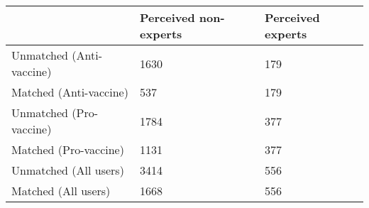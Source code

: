 \begin{table}[ht]
\centering
\begin{tabular}{lll}
  \hline
  & Perceived non-experts & Perceived experts \\ 
  \hline
Unmatched (Anti-vaccine) & 1630 & 179 \\ 
  Matched (Anti-vaccine) & 537 & 179 \\ 
  Unmatched (Pro-vaccine) & 1784 & 377 \\ 
  Matched (Pro-vaccine) & 1131 & 377 \\ 
  Unmatched (All users) & 3414 & 556 \\ 
  Matched (All users) & 1668 & 556 \\ 
   \hline
\end{tabular}
\end{table}
